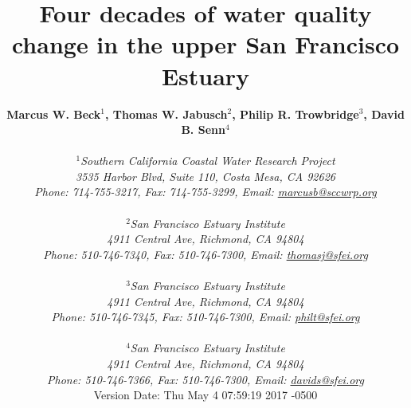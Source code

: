 \documentclass[letterpaper,12pt,oneside]{article}\usepackage[]{graphicx}\usepackage[]{color}
\begin{document}
\raggedbottom
\linenumbers
\raggedright
{}
\setlength{\parindent}{0.5in}
\renewcommand\refname{References \vspace{12pt}}

\begin{singlespace}
\title{{\bf {\Large Four decades of water quality change in the upper San Francisco Estuary}}}
\author{
  {\bf {\normalsize Marcus W. Beck$^1$, Thomas W. Jabusch$^2$, Philip R. Trowbridge$^3$, David B. Senn$^4$}}
  \\\\{\textit {\normalsize $^1$Southern California Coastal Water Research Project}}
  \\{\textit {\normalsize 3535 Harbor Blvd, Suite 110, Costa Mesa, CA 92626}}
	\\{\textit {\normalsize Phone: 714-755-3217, Fax: 714-755-3299, Email: \href{mailto:marcusb@sccwrp.org}{marcusb@sccwrp.org}}}
  \\\\{\textit {\normalsize $^2$San Francisco Estuary Institute}}
	\\{\textit {\normalsize 4911 Central Ave, Richmond, CA 94804}}
	\\{\textit {\normalsize Phone: 510-746-7340, Fax: 510-746-7300, Email: \href{mailto:thomasj@sfei.org}{thomasj@sfei.org}}}
	\\\\{\textit {\normalsize $^3$San Francisco Estuary Institute}}
	\\{\textit {\normalsize 4911 Central Ave, Richmond, CA 94804}}
	\\{\textit {\normalsize Phone: 510-746-7345, Fax: 510-746-7300, Email: \href{mailto:philt@sfei.org}{philt@sfei.org}}}
	\\\\{\textit {\normalsize $^4$San Francisco Estuary Institute}}
	\\{\textit {\normalsize 4911 Central Ave, Richmond, CA 94804}}
	\\{\textit {\normalsize Phone: 510-746-7366, Fax: 510-746-7300, Email: \href{mailto:davids@sfei.org}{davids@sfei.org}}}
  \vspace{1in}
  \\ Version Date:   Thu May 4 07:59:19 2017 -0500
	}
\date{}
\maketitle
\end{singlespace}
\end{document}
